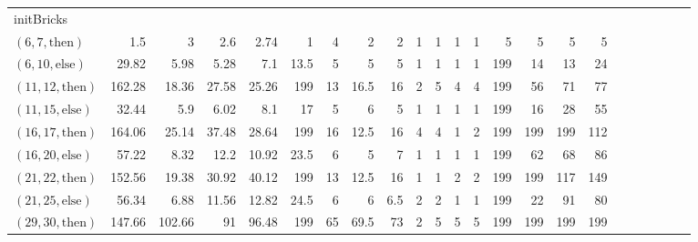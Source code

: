 \documentclass[sigconf]{acmart}
\newcommand{\thenBr}{\text{then}}
\newcommand{\elseBr}{\text{else}}
\begin{document}
\begin{table*}
{\begin{tabular}{l|rrrr|rrrr|rrrr|rrrr|r|r|r|r|r|r}
    \midrule
    initBricks        &             &             &                &               &       &       &         &         &          &          &            &             &          &         &            & & & & & & & \\
    $(6,7,\thenBr)$   & 1.5         & 3           & 2.6            & 2.74          & 1     & 4     & 2       & 2       & 1        & 1        & 1          & 1           & 5        & 5       & 5          & 5 & & & & & & \\
    $(6,10,\elseBr)$  & 29.82       & 5.98        & 5.28           & 7.1           & 13.5  & 5     & 5       & 5       & 1        & 1        & 1          & 1           & 199      & 14      & 13         & 24 & & & & & & \\
    $(11,12,\thenBr)$ & 162.28      & 18.36       & 27.58          & 25.26         & 199   & 13    & 16.5    & 16      & 2        & 5        & 4          & 4           & 199      & 56      & 71         & 77 & & & & & & \\
    $(11,15,\elseBr)$ & 32.44       & 5.9         & 6.02           & 8.1           & 17    & 5     & 6       & 5       & 1        & 1        & 1          & 1           & 199      & 16      & 28         & 55 & & & & & & \\
    $(16,17,\thenBr)$ & 164.06      & 25.14       & 37.48          & 28.64         & 199   & 16    & 12.5    & 16      & 4        & 4        & 1          & 2           & 199      & 199     & 199        & 112 & & & & & & \\
    $(16,20,\elseBr)$ & 57.22       & 8.32        & 12.2           & 10.92         & 23.5  & 6     & 5       & 7       & 1        & 1        & 1          & 1           & 199      & 62      & 68         & 86 & & & & & & \\
    $(21,22,\thenBr)$ & 152.56      & 19.38       & 30.92          & 40.12         & 199   & 13    & 12.5    & 16      & 1        & 1        & 2          & 2           & 199      & 199     & 117        & 149 & & & & & & \\
    $(21,25,\elseBr)$ & 56.34       & 6.88        & 11.56          & 12.82         & 24.5  & 6     & 6       & 6.5     & 2        & 2        & 1          & 1           & 199      & 22      & 91         & 80 & & & & & & \\
    $(29,30,\thenBr)$ & 147.66      & 102.66      & 91             & 96.48         & 199   & 65    & 69.5    & 73      & 2        & 5        & 5          & 5           & 199      & 199     & 199        & 199& & & & & & \\

\end{tabular}}
\end{table*}
\end{document}
